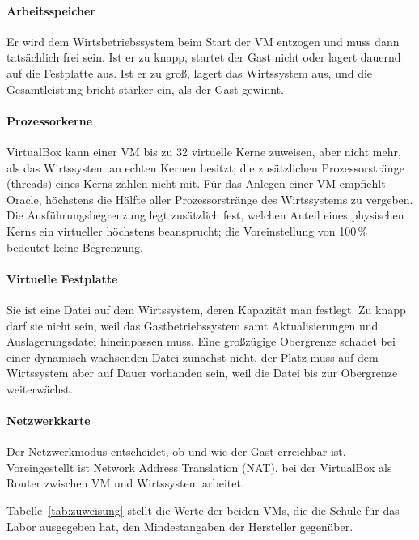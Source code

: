 \paragraph{Arbeitsspeicher} Er wird dem Wirtsbetriebssystem beim Start der VM entzogen und muss dann tatsächlich frei sein. Ist er zu knapp, startet der Gast nicht oder lagert dauernd auf die Festplatte aus. Ist er zu groß, lagert das Wirtssystem aus, und die Gesamtleistung bricht stärker ein, als der Gast gewinnt.

\paragraph{Prozessorkerne} VirtualBox kann einer VM bis zu 32 virtuelle Kerne zuweisen, aber nicht mehr, als das Wirtssystem an echten Kernen besitzt; die zusätzlichen Prozessorstränge (threads) eines Kerns zählen nicht mit. Für das Anlegen einer VM empfiehlt Oracle, höchstens die Hälfte aller Prozessorstränge des Wirtssystems zu vergeben. Die Ausführungsbegrenzung legt zusätzlich fest, welchen Anteil eines physischen Kerns ein virtueller höchstens beansprucht; die Voreinstellung von 100\,\% bedeutet keine Begrenzung.

\paragraph{Virtuelle Festplatte} Sie ist eine Datei auf dem Wirtssystem, deren Kapazität man festlegt. Zu knapp darf sie nicht sein, weil das Gastbetriebssystem samt Aktualisierungen und Auslagerungsdatei hineinpassen muss. Eine großzügige Obergrenze schadet bei einer dynamisch wachsenden Datei zunächst nicht, der Platz muss auf dem Wirtssystem aber auf Dauer vorhanden sein, weil die Datei bis zur Obergrenze weiterwächst.

\paragraph{Netzwerkkarte} Der Netzwerkmodus entscheidet, ob und wie der Gast erreichbar ist. Voreingestellt ist Network Address Translation (NAT), bei der VirtualBox als Router zwischen VM und Wirtssystem arbeitet.

Tabelle~\ref{tab:zuweisung} stellt die Werte der beiden VMs, die die Schule für das Labor ausgegeben hat, den Mindestangaben der Hersteller gegenüber.


